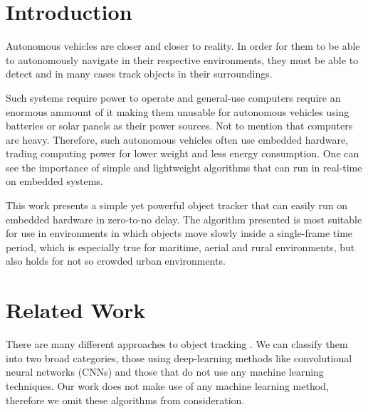 \documentclass[10pt,twocolumn,letterpaper]{article}
\begin{document}
\section{Introduction}

Autonomous vehicles are closer and closer to reality. In order for them to be able to
autonomously navigate in their respective environments, they must be able to detect and
in many cases track objects in their surroundings.

Such systems require power to operate and general-use computers require an enormous
ammount of it making them unusable for autonomous vehicles using batteries or solar panels
as their power sources. Not to mention that computers are heavy. Therefore, such
autonomous vehicles often use embedded hardware, trading computing power for lower
weight and less energy consumption. One can see the importance of simple and lightweight
algorithms that can run in real-time on embedded systems.

This work presents a simple yet powerful object tracker that can easily run on embedded
hardware in zero-to-no delay. The algorithm presented is most suitable for use in
environments in which objects move slowly inside a single-frame time period, which is
especially true for maritime, aerial and rural environments, but also holds for not so crowded
urban environments.



\section{Related Work}

There are many different approaches to object tracking \cite{1195991,bewley2016simple,wojke2017simple,mahmoudi2019multi,fortmann1980multi,girshick2015fast}.
We can classify them into two broad categories, those using deep-learning methods like convolutional
neural networks (CNNs) and those that do not use any machine learning techniques. Our work does not
make use of any machine learning method, therefore we omit these algorithms from consideration.
\end{document}
